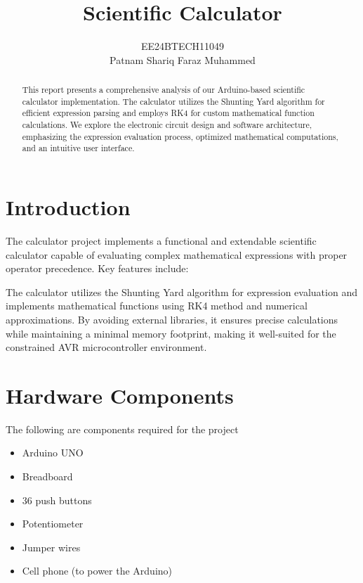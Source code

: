 \documentclass[journal]{IEEEtran}
\numberwithin{equation}{enumi}
\numberwithin{figure}{enumi}
\begin{document}


\title{Scientific Calculator}
\author{EE24BTECH11049 \\ Patnam Shariq Faraz Muhammed}


{\let\newpage\relax\maketitle}
\begin{abstract}
    This report presents a comprehensive analysis of our Arduino-based scientific calculator implementation. The calculator utilizes the Shunting Yard algorithm for efficient expression parsing and employs RK4 for custom mathematical function calculations. We explore the electronic circuit design and software architecture, emphasizing the expression evaluation process, optimized mathematical computations, and an intuitive user interface.
\end{abstract}

\newpage
\tableofcontents

\newpage
\section{Introduction}
The calculator project implements a functional and extendable scientific calculator capable of evaluating complex mathematical expressions with proper operator precedence. Key features include:

The calculator utilizes the Shunting Yard algorithm for expression evaluation and implements mathematical functions using RK4 method and numerical approximations. By avoiding external libraries, it ensures precise calculations while maintaining a minimal memory footprint, making it well-suited for the constrained AVR microcontroller environment.

\section{Hardware Components}
The following are components required for the project
\begin{itemize}
    \item Arduino UNO
    \item Breadboard
    \item 36 push buttons
    \item Potentiometer
    \item Jumper wires
    \item Cell phone (to power the Arduino)
\end{itemize}
\end{document}
